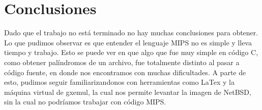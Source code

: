 \documentclass[10pt,a4paper]{article}
\begin{document}


\section{Conclusiones}

Dado que el trabajo no está terminado no hay muchas conclusiones para obtener. Lo que pudimos observar es que entender el lenguaje MIPS no es simple y lleva tiempo y trabajo. Esto se puede ver en que algo que fue muy simple en código C, como obtener palíndromos de un archivo, fue totalmente distinto al pasar a código fuente, en donde nos encontramos con muchas dificultades. A parte de esto, pudimos seguir familiarizandonos con herramientas como LaTex y la máquina virtual de gxemul, la cual nos permite levantar la imagen de NetBSD, sin la cual no podríamos trabajar con código MIPS.
\end{document}
